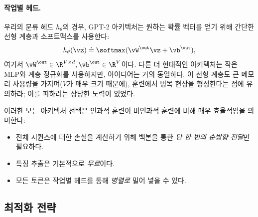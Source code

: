 \documentclass[../../book-main_ko.tex]{subfiles}
\begin{document}
\paragraph{작업별 헤드.} 우리의 분류 헤드 \(h_{\theta}\)의 경우, GPT-2 아키텍처는 원하는 확률 벡터를 얻기 위해 간단한 선형 계층과 소프트맥스를 사용한다:
\begin{equation}
    h_{\theta}(\vz) \doteq \softmax(\vW^{\out}\vz + \vb^{\out}),
\end{equation}
여기서 \(\vW^{\out} \in \R^{V \times d}, \vb^{\out} \in \R^{V}\)이다. 다른 더 현대적인 아키텍처는 작은 MLP와 계층 정규화를 사용하지만, 아이디어는 거의 동일하다. 이 선형 계층도 큰 메모리 사용량을 가지며(\(V\)가 매우 크기 때문에), 훈련에서 병목 현상을 형성한다는 점에 유의하라; 이를 피하려는 상당한 노력이 있었다.

이러한 모든 아키텍처 선택은 인과적 훈련이 비인과적 훈련에 비해 매우 효율적임을 의미한다:
\begin{itemize}
    \item 전체 시퀀스에 대한 손실을 계산하기 위해 백본을 통한 \textit{단 한 번의 순방향 전달}만 필요하다.
    \item 특징 추출은 기본적으로 \textit{무료}이다.
    \item 모든 토큰은 작업별 헤드를 통해 \textit{병렬로} 밀어 넣을 수 있다.
\end{itemize}

\subsection{최적화 전략}
\end{document}
